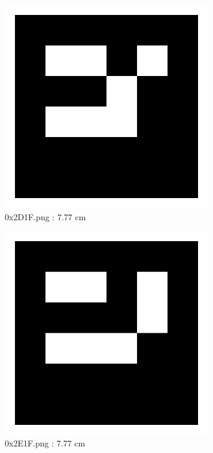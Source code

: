 \documentclass[11pt,a4,BCOR=0cm]{scrartcl}
\begin{document}
\begin{figure}
  \centering
    \includegraphics[natwidth=400,natheight=400,width=9cm]{0x2D1F.png}
    \caption{0x2D1F.png : 7.77 cm}
    \label{fig:0x2D1F.png}
  
\end{figure} 

\begin{figure}
  \centering
    \includegraphics[natwidth=400,natheight=400,width=9cm]{0x2E1F.png}
    \caption{0x2E1F.png : 7.77 cm}
    \label{fig:0x2E1F.png}
  
\end{figure} 

\clearpage
\end{document}
